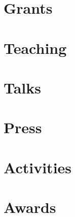 \documentclass[margin,line]{res}
\begin{document}
\begin{resume}
\section{\sc Grants}




% 

\section{\sc Teaching}



\section{\sc Talks}



\section{\sc Press}



\section{\sc Activities}



\section{\sc Awards}



\end{resume}
\end{document}
